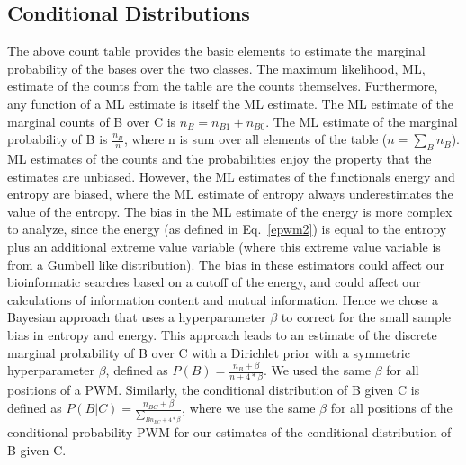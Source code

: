 \subsection{Conditional Distributions}\label{cdhyper}
The above count table provides the basic elements to estimate the marginal probability of the bases over the two classes.  The maximum likelihood, ML, estimate of the counts from the table are the counts themselves.  Furthermore, any function of a ML estimate is itself the ML estimate.  The ML estimate of the marginal counts of B over C is $n_{B}=n_{B1}+n_{B0}$.  The ML estimate of the marginal probability of B is $\frac{n_B}{n}$, where n is sum over all elements of the table ($n=\sum_B n_B$).  ML estimates of the counts and the probabilities enjoy the property that the estimates are unbiased.  However, the ML estimates of the functionals energy and entropy are biased, where the ML estimate of entropy always underestimates the value of the entropy\cite{Nemenman02entropyand}. The bias in the ML estimate of the energy is more complex to analyze, since the energy (as defined in Eq.~\ref{epwm2}) is equal to the entropy plus an additional extreme value variable (where this extreme value variable is from a Gumbell like distribution).  The bias in these estimators could affect our bioinformatic searches based on a cutoff of the energy, and could affect our calculations of information content and mutual information.  Hence we chose a Bayesian approach that uses a hyperparameter $\beta$ to correct for the small sample bias in entropy and energy.  This approach leads to an estimate of the discrete marginal probability of B over C with a Dirichlet prior with a symmetric hyperparameter $\beta$, defined as $P(B)=\frac{n_{B}+\beta}{n+4*\beta}$.  We used the same $\beta$ for all positions of a PWM\cite{MEP}.  Similarly, the conditional distribution of B given C is defined  as $P(B|C)=\frac{n_{BC}+\beta}{\sum_{B{n_{BC}}+4*\beta}}$, where we use the same $\beta$ for all positions of the conditional probability PWM for our estimates of the conditional distribution of B given C. 


